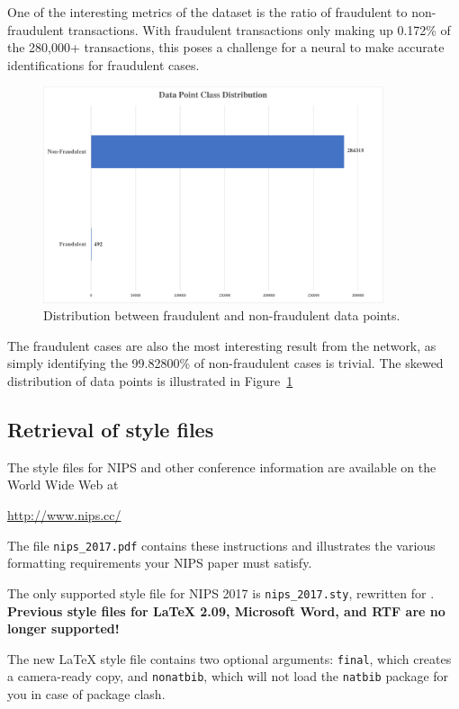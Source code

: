 \documentclass{article}
\begin{document}
 One of the interesting metrics of the dataset is the ratio of fraudulent to non-fraudulent transactions. 
 With fraudulent transactions only making up 0.172\% of the 280,000+ transactions, this poses a 
 challenge for a neural to make accurate identifications for fraudulent cases. 

\begin{figure}
  \begin{center}
    \includegraphics[width=100mm]{DataDistribution.pdf}
    \caption{Distribution between fraudulent and non-fraudulent data points.}
    \label{data-distribution}
  \end{center}
\end{figure}

 The fraudulent cases are also the most interesting result from the network, as simply identifying the 
 99.82800\% of non-fraudulent cases is trivial. The skewed distribution of data points is illustrated
 in Figure~\ref{data-distribution}

\subsection{Retrieval of style files}

The style files for NIPS and other conference information are
available on the World Wide Web at
\begin{center}
  \url{http://www.nips.cc/}
\end{center}
The file \verb+nips_2017.pdf+ contains these instructions and
illustrates the various formatting requirements your NIPS paper must
satisfy.

The only supported style file for NIPS 2017 is \verb+nips_2017.sty+,
rewritten for \LaTeXe{}.  \textbf{Previous style files for \LaTeX{}
  2.09, Microsoft Word, and RTF are no longer supported!}

The new \LaTeX{} style file contains two optional arguments:
\verb+final+, which creates a camera-ready copy, and \verb+nonatbib+,
which will not load the \verb+natbib+ package for you in case of
package clash.
\end{document}
